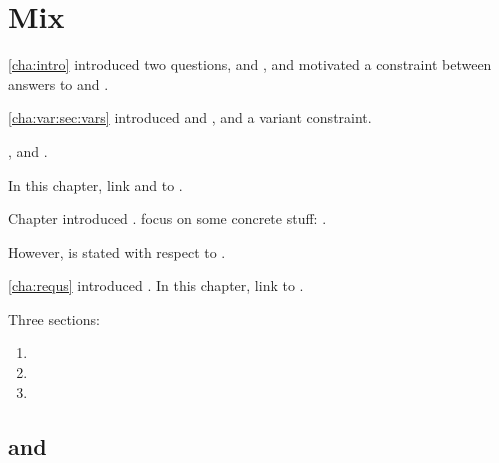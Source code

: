 \chapter{Mix}
\label{cha:binding}

\begin{note}
  \autoref{cha:intro} introduced two questions, \qWhy{} and \qHow{}, and motivated a constraint between answers to \qWhy{} and \qHow{}.

  \autoref{cha:var:sec:vars} introduced \qWhyV{} and \qHowV{}, and a variant constraint.

  \fc{}, and \requ{}.

  In this chapter, link  and  to \qWhyV{}.
\end{note}

\begin{note}
  Chapter introduced .
   focus on some concrete stuff: .

  However, \qWhyV{} is stated with respect to \ros{}.
\end{note}


\begin{note}
  \autoref{cha:requs} introduced .
  In this chapter, link  to \qWhyV{}.
\end{note}

\begin{note}
  Three sections:
  \begin{enumerate}[label=]
  \item
  \item
  \item
  \end{enumerate}
\end{note}

\section{ and }
\label{cha:binding:sec:requRos}

